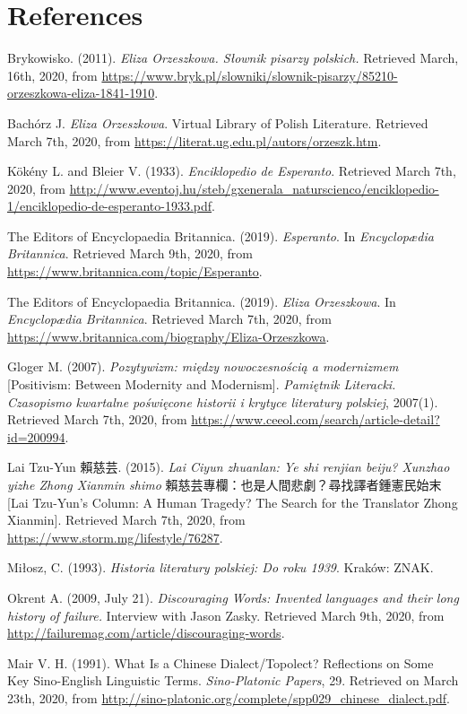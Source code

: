 \chapter*{References}

Brykowisko. (2011). \textit{Eliza Orzeszkowa. Słownik pisarzy polskich.} Retrieved March, 16th, 2020, from \url{https://www.bryk.pl/slowniki/slownik-pisarzy/85210-orzeszkowa-eliza-1841-1910}.

Bachórz J. \textit{Eliza Orzeszkowa}. Virtual Library of Polish Literature. Retrieved March 7th, 2020, from \url{https://literat.ug.edu.pl/autors/orzeszk.htm}.

Kökény L. and Bleier V. (1933). \textit{Enciklopedio de Esperanto}. Retrieved March 7th, 2020, from \url{http://www.eventoj.hu/steb/gxenerala_naturscienco/enciklopedio-1/enciklopedio-de-esperanto-1933.pdf}.

The Editors of Encyclopaedia Britannica. (2019). \textit{Esperanto}. In \textit{Encyclopædia Britannica}. Retrieved March 9th, 2020, from \url{https://www.britannica.com/topic/Esperanto}.

The Editors of Encyclopaedia Britannica. (2019). \textit{Eliza Orzeszkowa}. In \textit{Encyclopædia Britannica}. Retrieved March 7th, 2020, from \url{https://www.britannica.com/biography/Eliza-Orzeszkowa}.

Gloger M. (2007). \textit{Pozytywizm: między nowoczesnością a modernizmem} [Positivism: Between Modernity and Modernism]. \textit{Pamiętnik Literacki. Czasopismo kwartalne poświęcone historii i krytyce literatury polskiej}, 2007(1). Retrieved March 7th, 2020, from \url{https://www.ceeol.com/search/article-detail?id=200994}.

Lai Tzu-Yun 賴慈芸. (2015). \textit{Lai Ciyun zhuanlan: Ye shi renjian beiju? Xunzhao yizhe Zhong Xianmin shimo} 賴慈芸專欄：也是人間悲劇？尋找譯者鍾憲民始末 [Lai Tzu-Yun's Column: A Human Tragedy? The Search for the Translator Zhong Xianmin]. Retrieved March 7th, 2020, from \url{https://www.storm.mg/lifestyle/76287}.

Miłosz, C. (1993). \textit{Historia literatury polskiej: Do roku 1939}. Kraków: ZNAK. 

Okrent A. (2009, July 21). \textit{Discouraging Words: Invented languages and their long history of failure.} Interview with Jason Zasky. Retrieved March 9th, 2020, from \url{http://failuremag.com/article/discouraging-words}.

Mair V. H. (1991). What Is a Chinese Dialect/Topolect? Reflections on Some Key Sino-English Linguistic Terms. \textit{Sino-Platonic Papers}, 29. Retrieved on March 23th, 2020, from \url{http://sino-platonic.org/complete/spp029_chinese_dialect.pdf}.

